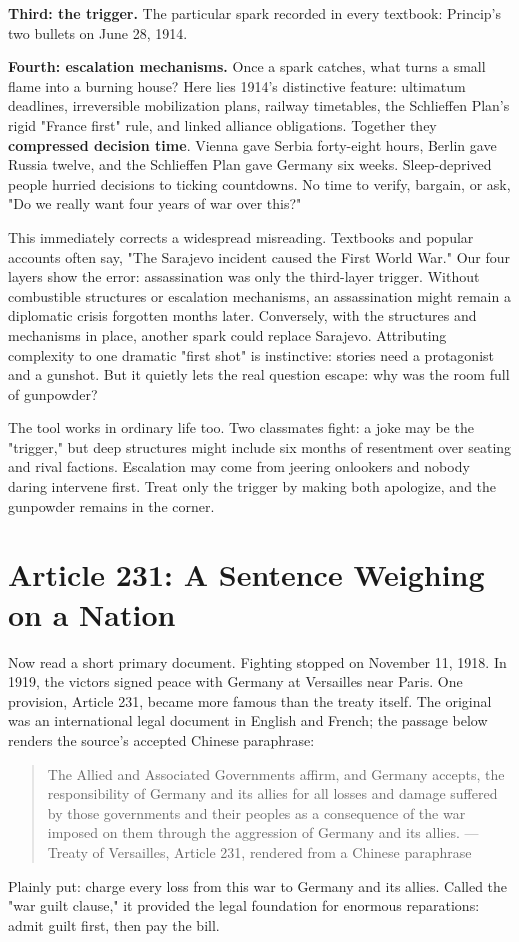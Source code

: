 \textbf{Third: the trigger.} The particular spark recorded in every textbook: Princip's two bullets on June 28, 1914.

\textbf{Fourth: escalation mechanisms.} Once a spark catches, what turns a small flame into a burning house? Here lies 1914's distinctive feature: ultimatum deadlines, irreversible mobilization plans, railway timetables, the Schlieffen Plan's rigid "France first" rule, and linked alliance obligations. Together they \textbf{compressed decision time}. Vienna gave Serbia forty-eight hours, Berlin gave Russia twelve, and the Schlieffen Plan gave Germany six weeks. Sleep-deprived people hurried decisions to ticking countdowns. No time to verify, bargain, or ask, "Do we really want four years of war over this?"

This immediately corrects a widespread misreading. Textbooks and popular accounts often say, "The Sarajevo incident caused the First World War." Our four layers show the error: assassination was only the third-layer trigger. Without combustible structures or escalation mechanisms, an assassination might remain a diplomatic crisis forgotten months later. Conversely, with the structures and mechanisms in place, another spark could replace Sarajevo. Attributing complexity to one dramatic "first shot" is instinctive: stories need a protagonist and a gunshot. But it quietly lets the real question escape: why was the room full of gunpowder?

The tool works in ordinary life too. Two classmates fight: a joke may be the "trigger," but deep structures might include six months of resentment over seating and rival factions. Escalation may come from jeering onlookers and nobody daring intervene first. Treat only the trigger by making both apologize, and the gunpowder remains in the corner.

\section{Article 231: A Sentence Weighing on a Nation}
Now read a short primary document. Fighting stopped on November 11, 1918. In 1919, the victors signed peace with Germany at Versailles near Paris. One provision, Article 231, became more famous than the treaty itself. The original was an international legal document in English and French; the passage below renders the source's accepted Chinese paraphrase:

\begin{quote}
The Allied and Associated Governments affirm, and Germany accepts, the responsibility of Germany and its allies for all losses and damage suffered by those governments and their peoples as a consequence of the war imposed on them through the aggression of Germany and its allies. ---Treaty of Versailles, Article 231, rendered from a Chinese paraphrase
\end{quote}
Plainly put: charge every loss from this war to Germany and its allies. Called the "war guilt clause," it provided the legal foundation for enormous reparations: admit guilt first, then pay the bill.

